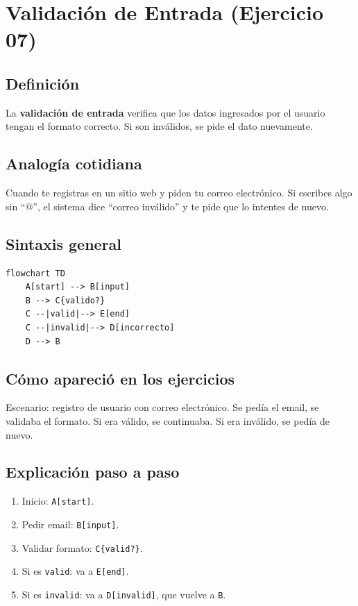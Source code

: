 \documentclass[12pt]{article}
\begin{document}
\newpage

\section{Validación de Entrada (Ejercicio 07)}

\subsection{Definición}

La \textbf{validación de entrada} verifica que los datos ingresados por el usuario tengan el formato correcto. Si son inválidos, se pide el dato nuevamente.

\subsection{Analogía cotidiana}

Cuando te registras en un sitio web y piden tu correo electrónico. Si escribes algo sin ``@'', el sistema dice ``correo inválido'' y te pide que lo intentes de nuevo.

\subsection{Sintaxis general}

\begin{lstlisting}[style=mermaidstyle]
flowchart TD
    A[start] --> B[input]
    B --> C{valido?}
    C --|valid|--> E[end]
    C --|invalid|--> D[incorrecto]
    D --> B
\end{lstlisting}

\subsection{Cómo apareció en los ejercicios}

Escenario: registro de usuario con correo electrónico. Se pedía el email, se validaba el formato. Si era válido, se continuaba. Si era inválido, se pedía de nuevo.

\subsection{Explicación paso a paso}

\begin{enumerate}
    \item Inicio: \texttt{A[start]}.
    \item Pedir email: \texttt{B[input]}.
    \item Validar formato: \texttt{C\{valid?\}}.
    \item Si es \texttt{valid}: va a \texttt{E[end]}.
    \item Si es \texttt{invalid}: va a \texttt{D[invalid]}, que vuelve a \texttt{B}.
\end{enumerate}
\end{document}
